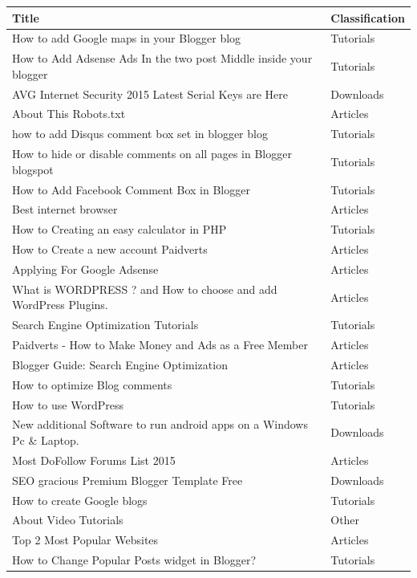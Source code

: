 \documentclass[a4paper, 11pt]{article}
\begin{document}
\begin{longtable}{ |p{12cm}|p{2cm}| }
\hline
Title
&
Classification \\
\hline
How to add Google maps in your Blogger blog
&
Tutorials \\
\hline
How to Add Adsense Ads In the two post Middle inside your blogger
&
Tutorials \\
\hline
AVG Internet Security 2015 Latest Serial Keys are Here
&
Downloads \\
\hline
About This Robots.txt
&
Articles \\
\hline
how to add Disqus comment box set in blogger blog
&
Tutorials \\
\hline
How to hide or disable comments on all pages in Blogger blogspot
&
Tutorials \\
\hline
How to Add Facebook Comment Box in Blogger
&
Tutorials \\
\hline
Best internet browser
&
Articles \\
\hline
How to Creating an easy calculator in PHP
&
Tutorials \\
\hline
How to Create a new account Paidverts
&
Articles \\
\hline
Applying For Google Adsense
&
Articles \\
\hline
What is WORDPRESS ? and How to choose and add WordPress Plugins.
&
Articles \\
\hline
Search Engine Optimization Tutorials
&
Tutorials \\
\hline
Paidverts - How to Make Money and Ads as a Free Member
&
Articles \\
\hline
Blogger Guide: Search Engine Optimization
&
Articles \\
\hline
How to optimize Blog comments
&
Tutorials \\
\hline
How to use WordPress
&
Tutorials \\
\hline
New additional Software  to run android apps on a Windows Pc \& Laptop.
&
Downloads \\
\hline
Most DoFollow Forums List 2015
&
Articles \\
\hline
SEO gracious Premium Blogger Template Free
&
Downloads \\
\hline
How to create Google blogs
&
Tutorials \\
\hline
About Video Tutorials
&
Other \\
\hline
Top 2 Most Popular Websites
&
Articles \\
\hline
How to Change Popular Posts widget in Blogger?
&
Tutorials \\

\end{longtable}
\end{document}
